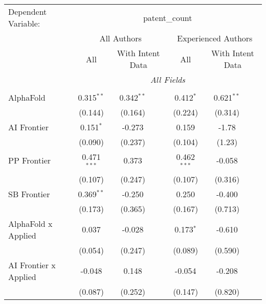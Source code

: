 \begingroup
\centering
\begin{tabular}{lcccccc}
   \tabularnewline \midrule \midrule
   Dependent Variable: & \multicolumn{6}{c}{patent\_count}\\
 & \multicolumn{3}{c}{All Authors} & \multicolumn{3}{c}{Experienced Authors} \\
\cmidrule(lr){2-4} \cmidrule(lr){5-7}
 & \multicolumn{1}{c}{All} & \multicolumn{2}{c}{With Intent Data} & \multicolumn{1}{c}{All} & \multicolumn{2}{c}{With Intent Data} \\
\cmidrule(lr){2-2} \cmidrule(lr){3-4} \cmidrule(lr){5-5} \cmidrule(lr){6-7}
 & \multicolumn{6}{c}{\textit{All Fields}} \\ \\
   AlphaFold                      & 0.315$^{**}$  & 0.342$^{**}$ &                & 0.412$^{*}$   & 0.621$^{**}$ &   \\   
                                  & (0.144)       & (0.164)      &                & (0.224)       & (0.314)      &   \\   
   AI Frontier                    & 0.151$^{*}$   & -0.273       &                & 0.159         & -1.78        &   \\   
                                  & (0.090)       & (0.237)      &                & (0.104)       & (1.23)       &   \\   
   PP Frontier                    & 0.471$^{***}$ & 0.373        &                & 0.462$^{***}$ & -0.058       &   \\   
                                  & (0.107)       & (0.247)      &                & (0.107)       & (0.316)      &   \\   
   SB Frontier                    & 0.369$^{**}$  & -0.250       &                & 0.250         & -0.400       &   \\   
                                  & (0.173)       & (0.365)      &                & (0.167)       & (0.713)      &   \\   
   AlphaFold x Applied            & 0.037         & -0.028       &                & 0.173$^{*}$   & -0.610       &   \\   
                                  & (0.054)       & (0.247)      &                & (0.089)       & (0.590)      &   \\   
   AI Frontier x Applied          & -0.048        & 0.148        &                & -0.054        & -0.208       &   \\   
                                  & (0.087)       & (0.252)      &                & (0.147)       & (0.820)      &   \\   

\end{tabular}
